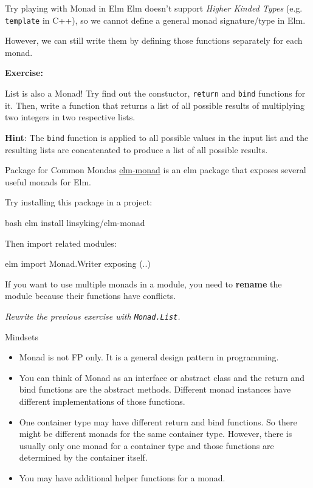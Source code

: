 \documentclass{beamer}
\begin{document}
\begin{frame}[fragile]{Try playing with Monad in Elm}
	Elm doesn't support \textit{Higher Kinded Types} (e.g. {\tt template} in C++), so we cannot define a general monad signature/type in Elm.
	\medskip\pause

	However, we can still write them by defining those functions separately for each monad.
	\medskip\pause

	\textbf{Exercise: }

	List is also a Monad! Try find out the constuctor, {\tt return} and {\tt bind} functions for it. Then, write a function that returns a list of all possible results of multiplying two integers in two respective lists.

	\textbf{Hint}: The {\tt bind} function is applied to all possible values in the input list and the resulting lists are concatenated to produce a list of all possible results.
\end{frame}
\begin{frame}[fragile]{Package for Common Mondas}
	\href{https://package.elm-lang.org/packages/linsyking/elm-monad/latest/}{elm-monad} is an elm package that exposes several useful monads for Elm.

	Try installing this package in a project:
	\begin{codetbox}{bash}
elm install linsyking/elm-monad
	\end{codetbox}
	Then import related modules:
	\begin{codetbox}{elm}
import Monad.Writer exposing (..)
	\end{codetbox}
	If you want to use multiple monads in a module, you need to \textbf{rename} the module because their functions have conflicts.
	
	\medskip\pause
	\em Rewrite the previous exercise with {\tt Monad.List}. \em
\end{frame}
\begin{frame}{Mindsets}

	\begin{itemize}
\item Monad is not FP only. It is a general design pattern in programming.
\item You can think of Monad as an interface or abstract class and the
return and bind functions are the abstract methods. Different monad
instances have different implementations of those functions.
\item One container type may have different return and bind functions.
So there might be different monads for the same container type.
However, there is usually only one monad for a container type and
those functions are determined by the container itself.
\item You may have additional helper functions for a monad.
\end{itemize}

\end{frame}
\end{document}
